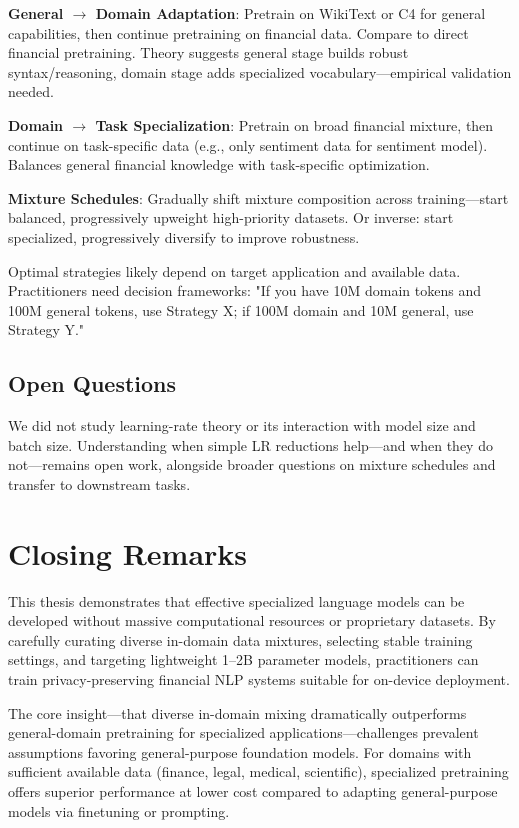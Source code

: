 \textbf{General $\rightarrow$ Domain Adaptation}: Pretrain on WikiText or C4 for general capabilities, then continue pretraining on financial data. Compare to direct financial pretraining. Theory suggests general stage builds robust syntax/reasoning, domain stage adds specialized vocabulary—empirical validation needed.

\textbf{Domain $\rightarrow$ Task Specialization}: Pretrain on broad financial mixture, then continue on task-specific data (e.g., only sentiment data for sentiment model). Balances general financial knowledge with task-specific optimization.

\textbf{Mixture Schedules}: Gradually shift mixture composition across training—start balanced, progressively upweight high-priority datasets. Or inverse: start specialized, progressively diversify to improve robustness.

Optimal strategies likely depend on target application and available data. Practitioners need decision frameworks: "If you have 10M domain tokens and 100M general tokens, use Strategy X; if 100M domain and 10M general, use Strategy Y."

\subsection{Open Questions}

We did not study learning-rate theory or its interaction with model size and batch size. Understanding when simple LR reductions help—and when they do not—remains open work, alongside broader questions on mixture schedules and transfer to downstream tasks.

\section{Closing Remarks}

This thesis demonstrates that effective specialized language models can be developed without massive computational resources or proprietary datasets. By carefully curating diverse in-domain data mixtures, selecting stable training settings, and targeting lightweight 1–2B parameter models, practitioners can train privacy-preserving financial NLP systems suitable for on-device deployment.

The core insight—that diverse in-domain mixing dramatically outperforms general-domain pretraining for specialized applications—challenges prevalent assumptions favoring general-purpose foundation models. For domains with sufficient available data (finance, legal, medical, scientific), specialized pretraining offers superior performance at lower cost compared to adapting general-purpose models via finetuning or prompting.

